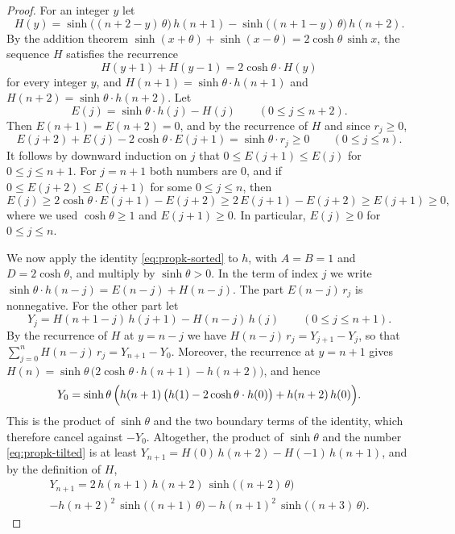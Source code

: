 \documentclass{amsart}
\theoremstyle{definition}
\theoremstyle{remark}
\numberwithin{equation}{section}
\begin{document}
\begin{proof}
For an integer $y$ let
\[
H(y)=\sinh\bigl((n+2-y)\,\theta\bigr)\,h(n+1)-\sinh\bigl((n+1-y)\,\theta\bigr)\,h(n+2).
\]
By the addition theorem $\sinh(x+\theta)+\sinh(x-\theta)=2\cosh\theta\,\sinh x$, the sequence $H$ satisfies the recurrence
\[
H(y+1)+H(y-1)=2\cosh\theta\cdot H(y)
\]
for every integer $y$, and $H(n+1)=\sinh\theta\cdot h(n+1)$ and $H(n+2)=\sinh\theta\cdot h(n+2)$. Let
\[
E(j)=\sinh\theta\cdot h(j)-H(j)\qquad(0\le j\le n+2).
\]
Then $E(n+1)=E(n+2)=0$, and by the recurrence of $H$ and since $r_j\ge 0$,
\[
E(j+2)+E(j)-2\cosh\theta\cdot E(j+1)=\sinh\theta\cdot r_j\ge 0\qquad(0\le j\le n).
\]
It follows by downward induction on $j$ that $0\le E(j+1)\le E(j)$ for $0\le j\le n+1$. For $j=n+1$ both numbers are $0$, and if $0\le E(j+2)\le E(j+1)$ for some $0\le j\le n$, then
\[
E(j)\ge 2\cosh\theta\cdot E(j+1)-E(j+2)\ge 2\,E(j+1)-E(j+2)\ge E(j+1)\ge 0,
\]
where we used $\cosh\theta\ge 1$ and $E(j+1)\ge 0$. In particular, $E(j)\ge 0$ for $0\le j\le n$.

We now apply the identity \eqref{eq:propk-sorted} to $h$, with $A=B=1$ and $D=2\cosh\theta$, and multiply by $\sinh\theta>0$. In the term of index $j$ we write $\sinh\theta\cdot h(n-j)=E(n-j)+H(n-j)$. The part $E(n-j)\,r_j$ is nonnegative. For the other part let
\[
Y_j=H(n+1-j)\,h(j+1)-H(n-j)\,h(j)\qquad(0\le j\le n+1).
\]
By the recurrence of $H$ at $y=n-j$ we have $H(n-j)\,r_j=Y_{j+1}-Y_j$, so that $\sum_{j=0}^{n}H(n-j)\,r_j=Y_{n+1}-Y_0$. Moreover, the recurrence at $y=n+1$ gives $H(n)=\sinh\theta\,\bigl(2\cosh\theta\cdot h(n+1)-h(n+2)\bigr)$, and hence
\[
Y_0=\sinh\theta\,\Bigl(h(n+1)\,\bigl(h(1)-2\cosh\theta\cdot h(0)\bigr)+h(n+2)\,h(0)\Bigr).
\]
This is the product of $\sinh\theta$ and the two boundary terms of the identity, which therefore cancel against $-Y_0$. Altogether, the product of $\sinh\theta$ and the number \eqref{eq:propk-tilted} is at least $Y_{n+1}=H(0)\,h(n+2)-H(-1)\,h(n+1)$, and by the definition of $H$,
\begin{multline*}
Y_{n+1}=2\,h(n+1)\,h(n+2)\,\sinh\bigl((n+2)\,\theta\bigr)\\
-h(n+2)^2\,\sinh\bigl((n+1)\,\theta\bigr)-h(n+1)^2\,\sinh\bigl((n+3)\,\theta\bigr).
\end{multline*}


\end{proof}
\end{document}
